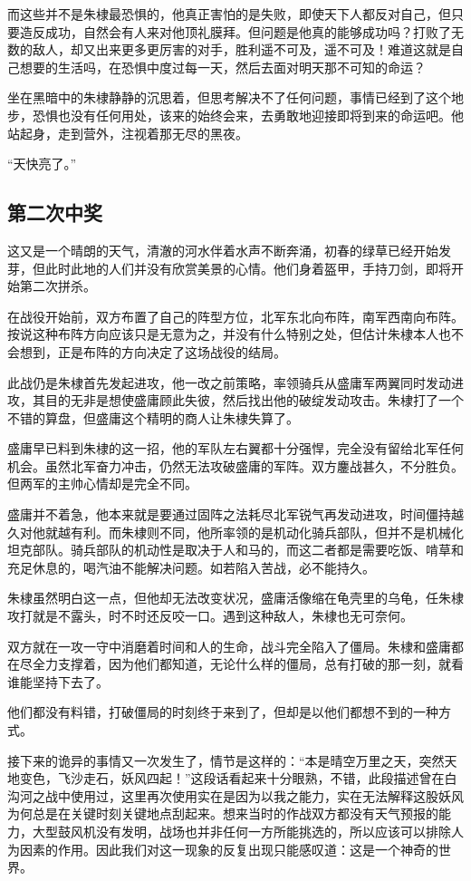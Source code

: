 \begin{multicols}{\theparacolNo}
		而这些并不是朱棣最恐惧的，他真正害怕的是失败，即使天下人都反对自己，但只要造反成功，自然会有人来对他顶礼膜拜。但问题是他真的能够成功吗？打败了无数的敌人，却又出来更多更厉害的对手，胜利遥不可及，遥不可及！难道这就是自己想要的生活吗，在恐惧中度过每一天，然后去面对明天那不可知的命运？

		坐在黑暗中的朱棣静静的沉思着，但思考解决不了任何问题，事情已经到了这个地步，恐惧也没有任何用处，该来的始终会来，去勇敢地迎接即将到来的命运吧。他站起身，走到营外，注视着那无尽的黑夜。

		“天快亮了。”

		\subsection{第二次中奖}
		这又是一个晴朗的天气，清澈的河水伴着水声不断奔涌，初春的绿草已经开始发芽，但此时此地的人们并没有欣赏美景的心情。他们身着盔甲，手持刀剑，即将开始第二次拼杀。

		在战役开始前，双方布置了自己的阵型方位，北军东北向布阵，南军西南向布阵。按说这种布阵方向应该只是无意为之，并没有什么特别之处，但估计朱棣本人也不会想到，正是布阵的方向决定了这场战役的结局。

		此战仍是朱棣首先发起进攻，他一改之前策略，率领骑兵从盛庸军两翼同时发动进攻，其目的无非是想使盛庸顾此失彼，然后找出他的破绽发动攻击。朱棣打了一个不错的算盘，但盛庸这个精明的商人让朱棣失算了。

		盛庸早已料到朱棣的这一招，他的军队左右翼都十分强悍，完全没有留给北军任何机会。虽然北军奋力冲击，仍然无法攻破盛庸的军阵。双方鏖战甚久，不分胜负。但两军的主帅心情却是完全不同。

		盛庸并不着急，他本来就是要通过固阵之法耗尽北军锐气再发动进攻，时间僵持越久对他就越有利。而朱棣则不同，他所率领的是机动化骑兵部队，但并不是机械化坦克部队。骑兵部队的机动性是取决于人和马的，而这二者都是需要吃饭、啃草和充足休息的，喝汽油不能解决问题。如若陷入苦战，必不能持久。

		朱棣虽然明白这一点，但他却无法改变状况，盛庸活像缩在龟壳里的乌龟，任朱棣攻打就是不露头，时不时还反咬一口。遇到这种敌人，朱棣也无可奈何。

		双方就在一攻一守中消磨着时间和人的生命，战斗完全陷入了僵局。朱棣和盛庸都在尽全力支撑着，因为他们都知道，无论什么样的僵局，总有打破的那一刻，就看谁能坚持下去了。

		他们都没有料错，打破僵局的时刻终于来到了，但却是以他们都想不到的一种方式。

		接下来的诡异的事情又一次发生了，情节是这样的：“本是晴空万里之天，突然天地变色，飞沙走石，妖风四起！”这段话看起来十分眼熟，不错，此段描述曾在白沟河之战中使用过，这里再次使用实在是因为以我之能力，实在无法解释这股妖风为何总是在关键时刻关键地点刮起来。想来当时的作战双方都没有天气预报的能力，大型鼓风机没有发明，战场也并非任何一方所能挑选的，所以应该可以排除人为因素的作用。因此我们对这一现象的反复出现只能感叹道：这是一个神奇的世界。


\end{multicols}
